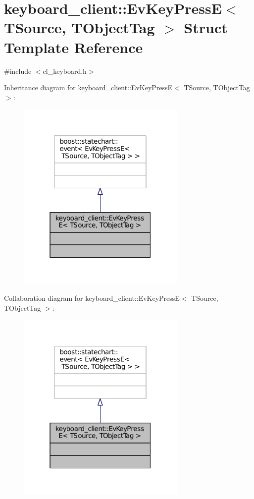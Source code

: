 \hypertarget{structkeyboard__client_1_1EvKeyPressE}{}\section{keyboard\+\_\+client\+:\+:Ev\+Key\+PressE$<$ T\+Source, T\+Object\+Tag $>$ Struct Template Reference}
\label{structkeyboard__client_1_1EvKeyPressE}


{\ttfamily \#include $<$cl\+\_\+keyboard.\+h$>$}



Inheritance diagram for keyboard\+\_\+client\+:\+:Ev\+Key\+PressE$<$ T\+Source, T\+Object\+Tag $>$\+:
\nopagebreak
\begin{figure}[H]
\begin{center}
\leavevmode
\includegraphics[width=232pt]{structkeyboard__client_1_1EvKeyPressE__inherit__graph}
\end{center}
\end{figure}


Collaboration diagram for keyboard\+\_\+client\+:\+:Ev\+Key\+PressE$<$ T\+Source, T\+Object\+Tag $>$\+:
\nopagebreak
\begin{figure}[H]
\begin{center}
\leavevmode
\includegraphics[width=232pt]{structkeyboard__client_1_1EvKeyPressE__coll__graph}
\end{center}
\end{figure}


